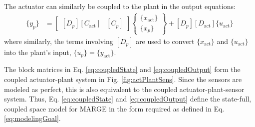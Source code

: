 The actuator can similarly be coupled to the plant in the output equations:
\begin{align}
	\label{eq:coupledOutput}
	\{y_p\} &= \begin{bmatrix}
		[D_p][C_\text{act}] & [C_p]
	\end{bmatrix} \begin{Bmatrix} \{x_\text{act}\} \\ \{x_p\} \end{Bmatrix}
	+ [D_p] [D_\text{act}] \{u_\text{act}\}
\end{align}
where similarly, the terms involving $[D_p]$ are used to convert $\{x_\text{act}\}$ and $\{u_\text{act}\}$ into the plant's input, $\{u_p\}=\{y_\text{act}\}$.

The block matrices in Eq. \ref{eq:coupledState} and \ref{eq:coupledOutput} form the coupled actuator-plant system in Fig. \ref{fig:actPlantSens}. Since the sensors are modeled as perfect, this is also equivalent to the coupled actuator-plant-sensor system. Thus, Eq. \ref{eq:coupledState} and \ref{eq:coupledOutput} define the state-full, coupled space model for MARGE in the form required as defined in Eq. \ref{eq:modelingGoal}.